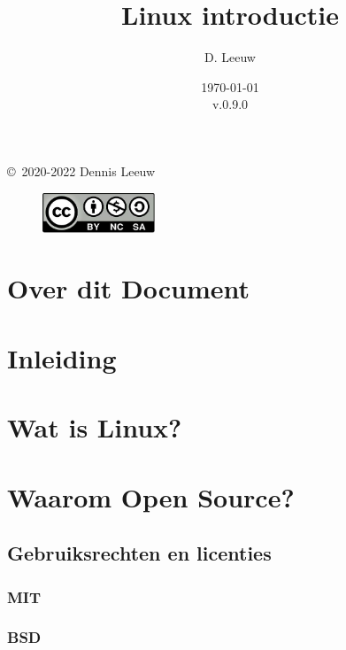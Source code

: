 \documentclass[a4paper,12pt,twoside,openright,titlepage]{book}
\author{D. Leeuw}
\title{Linux introductie}
\date{\today\\v.0.9.0}
\begin{document}

\maketitle

\copyright\ 2020-2022 Dennis Leeuw\\

\begin{figure}
\includegraphics[width=0.3\textwidth]{linuxreader-img001.png}
\end{figure}

\bigskip




\frontmatter
\chapter{Over dit Document}



\tableofcontents

\mainmatter
\chapter{Inleiding}


\chapter{Wat is Linux?}


\chapter{Waarom Open Source?}

\section{Gebruiksrechten en licenties}

\subsection{MIT}

\subsection{BSD}

\end{document}
